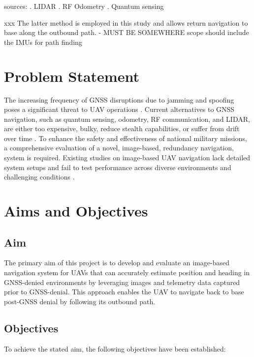sources:
\cite{scoutaerial2024lidar}. LIDAR
\cite{brewer_line_2024}. RF
\cite{Zhuang2023} Odometry
\cite{wright2022cold}.  Quantum sensing


 xxx
The latter method is employed in this study and allows return navigation to base along the outbound path.  - MUST BE SOMEWHERE 
scope should include the IMUs for path finding


\section{Problem Statement}
The increasing frequency of GNSS disruptions due to jamming and spoofing poses a significant threat to UAV operations \cite{geotab2024gps}. Current alternatives to GNSS navigation, such as quantum sensing, odometry, RF communication, and LIDAR, are either too expensive, bulky, reduce stealth capabilities, or suffer from drift over time \cite{wright2022cold, Zhuang2023, brewer_line_2024, scoutaerial2024lidar}. To enhance the safety and effectiveness of national military missions, a comprehensive evaluation of a novel, image-based, redundancy navigation, system is required. Existing studies on image-based UAV navigation lack detailed system setups and fail to test performance across diverse environments and challenging conditions \cite{sim2002integrated, Zhang2024}.

\section{Aims and Objectives}
\subsection{Aim}

The primary aim of this project is to develop and evaluate an image-based navigation system for UAVs that can accurately estimate position and heading in GNSS-denied environments by leveraging images and telemetry data captured prior to GNSS-denial. This approach enables the UAV to navigate back to base post-GNSS denial by following its outbound path.

\subsection{Objectives}

To achieve the stated aim, the following objectives have been established:

